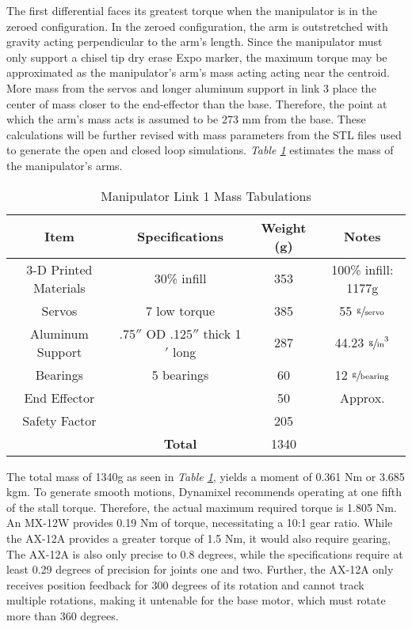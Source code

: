 The first differential faces its greatest torque when the manipulator is in the zeroed configuration. In the zeroed configuration, the arm is outstretched with gravity acting perpendicular to the arm’s length. Since the manipulator must only support a chisel tip dry erase Expo marker, the maximum torque may be approximated as the manipulator’s arm’s mass acting acting near the centroid. More mass from the servos and longer aluminum support in link 3 place the center of mass closer to the end-effector than the base. Therefore, the point at which the arm’s mass acts is assumed to be 273 mm from the base. These calculations will be further revised with mass parameters from the STL files used to generate the open and closed loop simulations. \emph{Table \ref{tab:arm1}} estimates the mass of the manipulator's arms.
\begin{table}[htp]
  \center
  \caption{Manipulator Link 1 Mass Tabulations}
  \label{tab:arm1}
\begin{tabular}{cc|cc}
  \textbf{Item} & \textbf{Specifications} & \textbf{Weight (g)} & \textbf{Notes} \\\hline
  3-D Printed Materials & 30\% infill & 353 & 100\% infill: 1177g \\
  Servos & 7 low torque & 385 & 55 $\sfrac{\text{g}}{\text{servo}}$ \\
  Aluminum Support & .75$''$  OD .125$''$  thick 1$'$ long & 287 & 44.23 $\sfrac{\text{g}}{\text{in}}^3$ \\
  Bearings & 5 bearings & 60 & 12 $\sfrac{\text{g}}{\text{bearing}}$ \\
  End Effector & & 50 & Approx. \\
  Safety Factor & & 205 & \\
  & \textbf{Total} & 1340 & \\
\end{tabular}
\end{table}

The total mass of 1340g as seen in \emph{Table \ref{tab:arm1}}, yields a moment of 0.361 Nm or 3.685 kgm. To generate smooth motions, Dynamixel recommends operating at one fifth of the stall torque. Therefore, the actual maximum required torque is 1.805 Nm. An MX-12W provides 0.19 Nm of torque, necessitating a 10:1 gear ratio. While the AX-12A provides a greater torque of 1.5 Nm, it would also require gearing, The AX-12A is also only precise to 0.8 degrees, while the specifications require at least 0.29 degrees of precision for joints one and two. Further, the AX-12A only receives position feedback for 300 degrees of its rotation and cannot track multiple rotations, making it untenable for the base motor, which must rotate more than 360 degrees.

